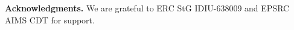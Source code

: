 \documentclass[10pt,twocolumn,letterpaper]{article}
\begin{document}
\begin{abstract}
\begin{comment}
We present a novel clustering objective that trains a randomly-initialised network into a classifier without any example labels provided in training or testing.
The discovered clusters correspond to semantic classes with high accuracy, setting new state-of-the-art records on 8 unsupervised datasets across image classification and segmentation, including STL10, an unsupervised variant of ImageNet on which we beat our closest competitor by 8\%. 
The method is not specialised to computer vision and can use any data with a pairwise distance metric; in our experiments we use random transforms to obtain a pair from each image.
The objective is simply to maximise mutual information between the class assignments of each pair.
It is easy to implement and rigorously grounded in information theory, meaning unlike other methods, we are able to avoid degenerate solutions with no effort. 
The objective optimises for the final clusters and therefore the trained network directly outputs semantic labels rather than high dimensional representations that need external processing to be usable.
In addition to the fully unsupervised mode, we also test two semi-supervised settings, setting a new global state of the art of 88.8\% accuracy on STL10 classification out of all known methods (whether supervised, semi-supervised or unsupervised) and demonstrating robustness to 90\% reductions in label coverage, of relevance to applications that wish to make use of small amounts of labels.
\end{comment}
\end{abstract}







{\noindent\textbf{Acknowledgments.} We are grateful to ERC StG IDIU-638009 and EPSRC AIMS CDT for support.}
{\small}
%
%
\end{document}
